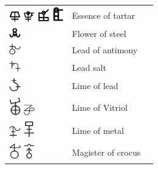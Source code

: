 \documentclass[british,final,landscape]{scrartcl}
\begin{document}
\begin{refsection}
\begin{supertabular}{p{0.3\textwidth}p{0.34\textwidth}p{0.34\textwidth}}
   \includegraphics[width=5mm]{Unknown/EssenceOfTartar} \includegraphics[width=5mm]{Unknown/EssenceOfTartar2} \includegraphics[width=5mm]{Unknown/EssenceOfTartar3} \includegraphics[width=5mm]{Unknown/EssenceOfTartar4} & Essence of tartar & \\
   \includegraphics[width=5mm]{Unknown/FlowerOfSteel} & Flower of steel & \\
   \includegraphics[width=5mm]{Unknown/LeadOfAntimony} & Lead of antimony & \\
   \includegraphics[width=5mm]{Unknown/LeadSalt} & Lead salt & \\
   \includegraphics[width=5mm]{Unknown/LimeOfLead} & Lime of lead & \\
   \includegraphics[width=5mm]{Unknown/LimeOfVitriol} \includegraphics[width=5mm]{Unknown/LimeOfVitriol2} & Lime of Vitriol & \\
   \includegraphics[width=5mm]{Unknown/MetalLime} \includegraphics[width=5mm]{Unknown/MetalLime2} & Lime of metal & \\
   \includegraphics[width=5mm]{Unknown/MagisterOfCrocus} \includegraphics[width=5mm]{Unknown/MagisterOfCrocus2} & Magister of crocus & \\

\end{supertabular}
\end{refsection}
\end{document}
